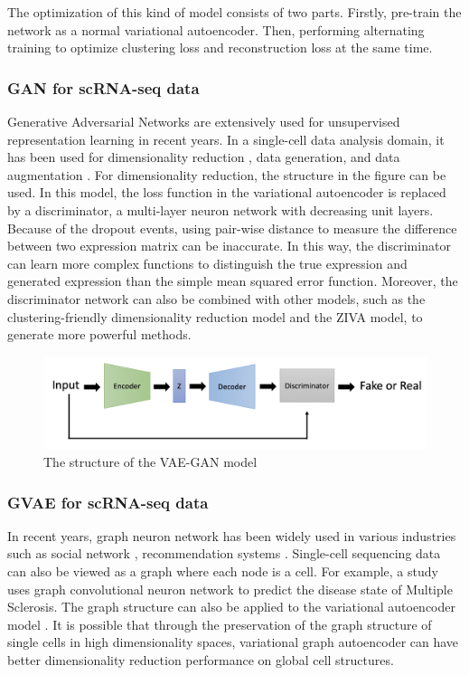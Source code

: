 The optimization of this kind of model consists of two parts. Firstly, pre-train the network as a normal variational autoencoder. Then, performing alternating training to optimize clustering loss and reconstruction loss at the same time.

\subsubsection{GAN for scRNA-seq data}
Generative Adversarial Networks \cite{radford2015unsupervised} are extensively used for unsupervised representation learning in recent years. In a single-cell data analysis domain, it has been used for dimensionality reduction \cite{lin2020deep}, data generation, and data augmentation \cite{marouf2018realistic}. For dimensionality reduction, the structure in the figure can be used. In this model, the loss function in the variational autoencoder is replaced by a discriminator, a multi-layer neuron network with decreasing unit layers. Because of the dropout events, using pair-wise distance to measure the difference between two expression matrix can be inaccurate. In this way, the discriminator can learn more complex functions to distinguish the true expression and generated expression than the simple mean squared error function. Moreover, the discriminator network can also be combined with other models, such as the clustering-friendly dimensionality reduction model and the ZIVA model, to generate more powerful methods.

\begin{figure}[htb!]
    \centering
    \includegraphics[width=1\textwidth]{figures/myfigures/vaegan.png}
    \caption{The structure of the VAE-GAN model}
    \label{dcstru}
\end{figure}

\subsubsection{GVAE for scRNA-seq data}
In recent years, graph neuron network has been widely used in various industries such as social network \cite{yang2016revisiting}, recommendation systems \cite{kipf2016semi}. Single-cell sequencing data can also be viewed as a graph where each node is a cell. For example, a study \cite{ravindra2020disease} uses graph convolutional neuron network \cite{velivckovic2017graph} to predict the disease state of Multiple Sclerosis. The graph structure can also be applied to the variational autoencoder model \cite{kipf2016variational}. It is possible that through the preservation of the graph structure of single cells in high dimensionality spaces, variational graph autoencoder can have better dimensionality reduction performance on global cell structures.

   